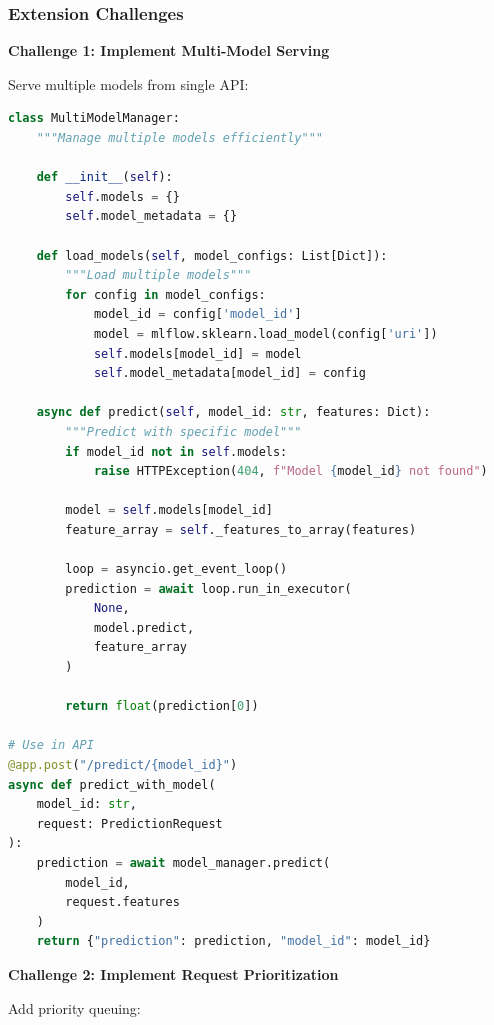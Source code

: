 \subsubsection{Extension Challenges}

\textbf{Challenge 1: Implement Multi-Model Serving}

Serve multiple models from single API:

\begin{lstlisting}[language=Python]
class MultiModelManager:
    """Manage multiple models efficiently"""

    def __init__(self):
        self.models = {}
        self.model_metadata = {}

    def load_models(self, model_configs: List[Dict]):
        """Load multiple models"""
        for config in model_configs:
            model_id = config['model_id']
            model = mlflow.sklearn.load_model(config['uri'])
            self.models[model_id] = model
            self.model_metadata[model_id] = config

    async def predict(self, model_id: str, features: Dict):
        """Predict with specific model"""
        if model_id not in self.models:
            raise HTTPException(404, f"Model {model_id} not found")

        model = self.models[model_id]
        feature_array = self._features_to_array(features)

        loop = asyncio.get_event_loop()
        prediction = await loop.run_in_executor(
            None,
            model.predict,
            feature_array
        )

        return float(prediction[0])

# Use in API
@app.post("/predict/{model_id}")
async def predict_with_model(
    model_id: str,
    request: PredictionRequest
):
    prediction = await model_manager.predict(
        model_id,
        request.features
    )
    return {"prediction": prediction, "model_id": model_id}
\end{lstlisting}

\textbf{Challenge 2: Implement Request Prioritization}

Add priority queuing:


